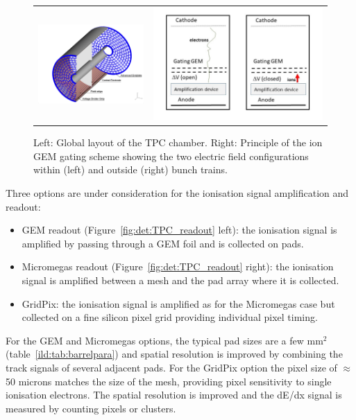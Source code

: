 \begin{figure}[t!]
\begin{tabular}{cc}
\includegraphics[width=0.6\hsize,viewport={0 -10 600 500},clip]{Detector/fig/TPC.png} &
\includegraphics[width=0.5\hsize]{Detector/fig/gate.jpg}
\end{tabular}
\caption[TPC layout]{Left: Global layout of the TPC chamber. Right: Principle of the ion GEM gating scheme showing the two electric field configurations within (left) and outside (right) bunch trains.}
\label{fig:det:TPC}
\end{figure}

Three options are under consideration for the ionisation signal amplification and readout:
\begin{itemize}
    \item GEM readout (Figure~\ref{fig:det:TPC_readout} left): the ionisation signal is amplified by passing through a GEM foil and is collected on pads.
    \item Micromegas readout (Figure~\ref{fig:det:TPC_readout} right): the ionisation signal is amplified between a mesh and the pad array where it is collected.
    \item GridPix: the ionisation signal is amplified as for the Micromegas case but collected on a fine silicon pixel grid providing individual pixel timing.
\end{itemize}
\vspace{0.5cm}
For the GEM and Micromegas options, the typical pad sizes are a few mm$^2$ (table~\ref{ild:tab:barrelpara}) and spatial resolution is improved by combining the track signals of several adjacent pads. For the GridPix option the pixel size of $\approx$50 microns matches the size of the mesh, providing pixel sensitivity to single ionisation electrons. The spatial resolution is improved and the dE/dx signal is measured by counting pixels or clusters. 

